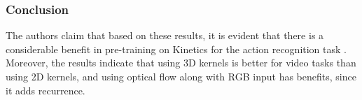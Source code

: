 \subsubsection{Conclusion}
The authors claim that based on these results, it is evident that there is a considerable 
benefit in pre-training on Kinetics for the action recognition task 
\cite{carreira2018quo}. Moreover, the results indicate that using 3D kernels is better for 
video tasks than using 2D kernels, and using optical flow along with RGB input has 
benefits, since it adds recurrence.